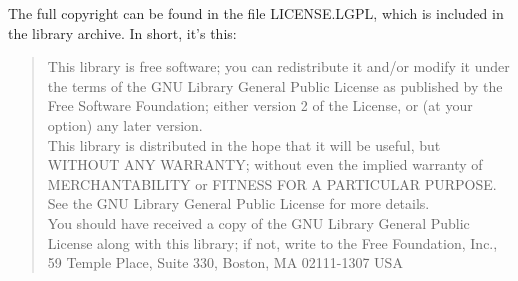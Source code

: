 	The full copyright can be found in the file LICENSE.LGPL, which is
	included in the library archive. In short, it's this:
	\begin{quotation}
	    This library is free software; you can redistribute it and/or
	    modify it under the terms of the GNU Library General Public
	    License as published by the Free Software Foundation; either
	    version 2 of the License, or (at your option) any later version.\\
	
	    This library is distributed in the hope that it will be useful,
	    but WITHOUT ANY WARRANTY; without even the implied warranty of
	    MERCHANTABILITY or FITNESS FOR A PARTICULAR PURPOSE.  See the GNU
	    Library General Public License for more details.\\
	
	    You should have received a copy of the GNU Library General Public
	    License along with this library; if not, write to the Free
	    Foundation, Inc., 59 Temple Place, Suite 330, Boston, MA  02111-1307
	    USA
	\end{quotation}


